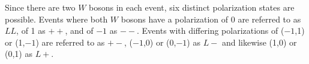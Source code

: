 Since there are two $W$ bosons in each event, six distinct polarization states are possible. Events where both $W$ bosons have a polarization of 0 are referred to as $LL$, of 1 as $++$, and of $-1$ as $--$. Events with differing polarizations of ($-1$,1) or (1,$-1$) are referred to as $+-$, ($-1$,0) or (0,$-1$) as $L-$ and likewise (1,0) or (0,1) as $L+$. 

